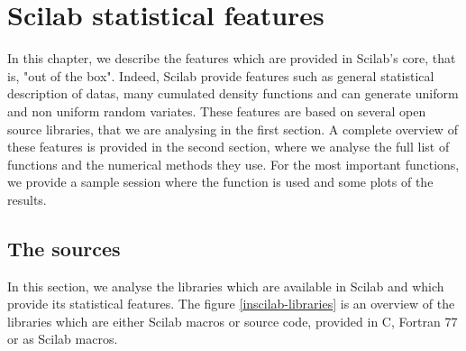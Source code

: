 \chapter{Scilab statistical features}

In this chapter, we describe the features which are provided 
in Scilab's core, that is, "out of the box".
Indeed, Scilab provide features such as general statistical 
description of datas, many cumulated density functions 
and can generate uniform and non uniform random variates.
These features are based on several open source libraries, that 
we are analysing in the first section.
A complete overview of these features is provided in the 
second section, where we analyse the full list of functions and 
the numerical methods they use. For the most important 
functions, we provide a sample session where the function is 
used and some plots of the results.

\section{The sources}

In this section, we analyse the libraries which are available 
in Scilab and which provide its statistical features.
The figure \ref{inscilab-libraries} is an overview of the 
libraries which are either Scilab macros or source code, provided
in C, Fortran 77 or as Scilab macros. 

